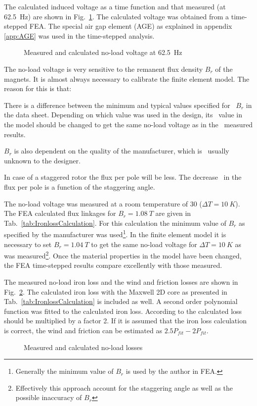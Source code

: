 The calculated induced voltage as a time function and that measured (at \SI{62.5}{Hz}) are shown in Fig.~\ref{fig:U1_time}. The calculated voltage was obtained from a time-stepped FEA. The special air gap element (AGE) as explained in appendix \ref{app:AGE} was used in the time-stepped analysis.    
\begin{figure}[htbp]
	\centering
		
	\caption{Measured and calculated no-load voltage at \SI{62.5}{Hz}}
	\label{fig:U1_time}
\end{figure}

The no-load voltage is very sensitive to the remanent flux density $B_{r}$ of the magnets. It is almost always necessary to calibrate the finite element model. The reason for this is that:
\begin{itemize*}
	\item There is a difference between the minimum and typical values specified for~%
	$B_{r}$ in the data sheet. Depending on which value was used in the design, its~%
	value in the model should be changed to get the same no-load voltage as in the~%
	measured results.
	\item $B_{r}$ is also dependent on the quality of the manufacturer, which is~%
	usually unknown to the designer.
	\item In case of a staggered rotor the flux per pole will be less. The decrease~%
	in the flux per pole is a function of the staggering angle.
\end{itemize*}
The no-load voltage was measured at a room temperature of \SI{30}{\degC} ($\Delta T=\SI{10}{K}$). The FEA calculated flux linkages for $B_r=\SI{1.08}{T}$ are given in Tab.~\ref{tab:IronlossCalculation}. For this calculation the minimum value of $B_r$ as specified by the manufacturer was used\footnote{Generally the minimum value of $B_r$ is used by the author in FEA.}. In the finite element model it is necessary to set $B_r=\SI{1.04}{T}$ to get the same no-load voltage for $\Delta T=\SI{10}{K}$ as was measured\footnote{Effectively this approach account for the staggering angle as well as the possible inaccuracy of $B_r$}. Once the material properties in the model have been changed, the FEA time-stepped results compare excellently with those measured.

The measured no-load iron loss and the wind and friction losses are shown in Fig.~\ref{fig:pfe_calc_meas}. The calculated iron loss with the Maxwell 2D core as presented in Tab.~\ref{tab:IronlossCalculation} is included as well. A second order polynomial function was fitted to the calculated iron loss. According to \cite{Germishuizen2008} the calculated loss should be multiplied by a factor 2. If it is assumed that the iron loss calculation is correct, the wind and friction can be estimated as $2.5P_{fit}-2P_{fit}$.
\begin{figure}[htbp]
	\centering
		
	\caption{Measured and calculated no-load losses}
	\label{fig:pfe_calc_meas}
\end{figure}


